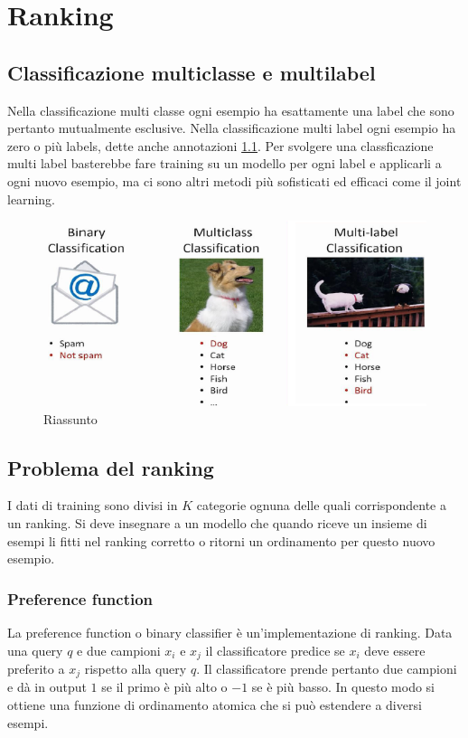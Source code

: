 \chapter{Ranking}

\section{Classificazione multiclasse e multilabel}
Nella classificazione multi classe ogni esempio ha esattamente una label che sono pertanto mutualmente esclusive.
Nella classificazione multi label ogni esempio ha zero o pi\`u labels, dette anche annotazioni \ref{fig:chapter07-00}. 
Per svolgere una classficazione multi label basterebbe fare training su un modello per ogni label e applicarli a ogni nuovo esempio, ma ci sono altri metodi pi\`u sofisticati ed efficaci come il joint learning.

\begin{figure}
	\centering
	\includegraphics[width=0.6\linewidth]{imgs/chapter7/img0}
	\caption{Riassunto}
	\label{fig:chapter07-00}
\end{figure}

\section{Problema del ranking}
I dati di training sono divisi in $K$ categorie ognuna delle quali corrispondente a un ranking.
Si deve insegnare a un modello che quando riceve un insieme di esempi li fitti nel ranking corretto o ritorni un ordinamento per questo nuovo esempio.

	\subsection{Preference function}
	La preference function o binary classifier \`e un'implementazione di ranking.
	Data una query $q$ e due campioni $x_i$ e $x_j$ il classificatore predice se $x_i$ deve essere preferito a $x_j$ rispetto alla query $q$.
	Il classificatore prende pertanto due campioni e d\`a in output $1$ se il primo \`e pi\`u alto o $-1$ se \`e pi\`u basso.
	In questo modo si ottiene una funzione di ordinamento atomica che si pu\`o estendere a diversi esempi.
	
